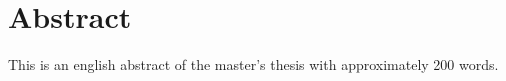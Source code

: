 \section*{Abstract}

This is an english abstract of the master's thesis with approximately 200 words.
